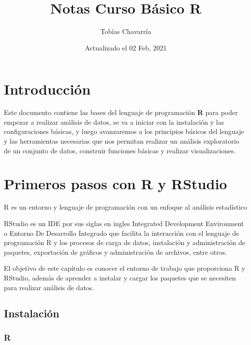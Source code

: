 \documentclass[
  12pt,
]{book}
\title{Notas Curso Básico R}
\author{Tobías Chavarría}
\date{Actualizado el 02 Feb, 2021}
\begin{document}
\maketitle

{
\hypersetup{linkcolor=}
\setcounter{tocdepth}{4}
\tableofcontents
}
\hypertarget{introducciuxf3n}{%
\chapter{Introducción}\label{introducciuxf3n}}

Este documento contiene las bases del lenguaje de programación \textbf{R} para poder
empezar a realizar análisis de datos, se va a iniciar con la instalación y las
configuraciones básicas, y luego avanzaremos a los principios básicos del
lenguaje y las herramientas necesarias que nos permitan realizar un análisis
exploratorio de un conjunto de datos, construir funciones básicas y realizar visualizaciones.

\hypertarget{primeros-pasos-con-r-y-rstudio}{%
\chapter{\texorpdfstring{\textbf{Primeros pasos con R y RStudio}}{Primeros pasos con R y RStudio}}\label{primeros-pasos-con-r-y-rstudio}}

R es un entorno y lenguaje de programación con un enfoque al análisis estadístico

RStudio es un IDE por sus siglas en ingles Integrated Development Environment o Entorno De Desarrollo Integrado que facilita la interacción con el lenguaje de programación R y los procesos de carga de datos, instalación y administración de paquetes, exportación de gráficos y administración de archivos, entre otros.

El objetivo de este capítulo es conocer el entorno de trabajo que proporciona R y RStudio, además de aprender a instalar y cargar los paquetes que se necesiten para realizar análisis de datos.

\hypertarget{instalaciuxf3n}{%
\section{\texorpdfstring{\textbf{Instalación}}{Instalación}}\label{instalaciuxf3n}}

\hypertarget{r}{%
\subsection{\texorpdfstring{\textbf{R}}{R}}\label{r}}
\end{document}
